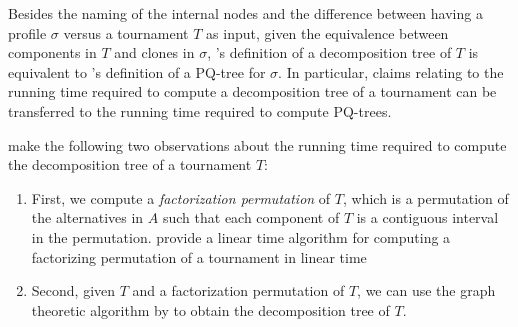 Besides the naming of the internal nodes and the difference between having a profile $\sigma$ versus a tournament $T$ as input, given the equivalence between components in $T$ and clones in $\sigma$, \citet{Brandt18:Extending}'s definition of a decomposition tree of $T$ is equivalent to \citet{Elkind10:Clone}'s definition of a PQ-tree for $\sigma$.
In particular, claims relating to the running time required to compute a decomposition tree of a tournament can be transferred to the running time required to compute PQ-trees.

\citet{Brandt18:Extending} make the following two observations about the running time required to compute the decomposition tree of a tournament $T$:
\begin{enumerate}
    \item First, we compute a \emph{factorization permutation} of $T$, which is a permutation of the alternatives in $A$ such that each component of $T$ is a contiguous interval in the permutation.
    \citet{McConnell05:Linear} provide a linear time algorithm for computing a factorizing permutation of a tournament in linear time
    \item Second, given $T$ and a factorization permutation of $T$, we can use the graph theoretic algorithm by \citet{Capelle02:Graph} to obtain the decomposition tree of $T$.
\end{enumerate}

